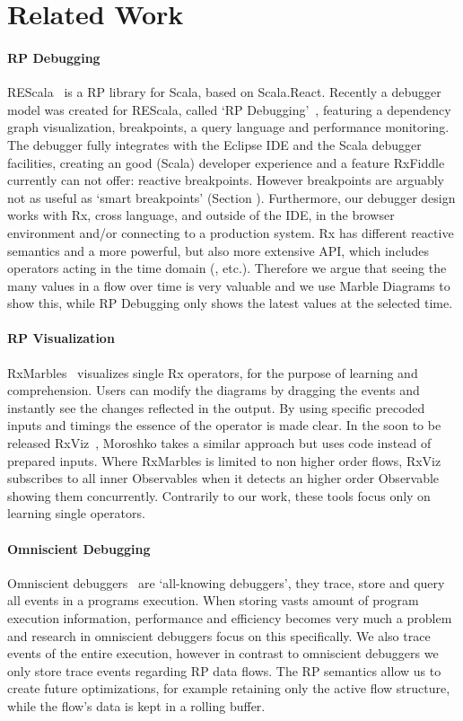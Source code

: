 \section{Related Work}

\paragraph{RP Debugging} 
REScala~\cite{salvaneschi2014rescala} is a RP library for Scala, based on Scala.React. 
Recently a debugger model was created for REScala, called `RP Debugging'~\cite{salvaneschi2016debugging}, 
featuring a dependency graph visualization, breakpoints, a query language and performance monitoring.
The debugger fully integrates with the Eclipse IDE and the Scala debugger facilities, 
creating an good (Scala) developer experience and a feature RxFiddle currently can not offer: reactive breakpoints. 
However breakpoints are arguably not as useful as `smart breakpoints' (Section \label{breakpoints}).
Furthermore, our debugger design works with Rx, cross language, and outside of the IDE,
in the browser environment and/or connecting to a production system.
Rx has different reactive semantics and a more powerful, but also more extensive API, which includes operators acting in the time domain (, etc.).
Therefore we argue that seeing the many values in a flow over time is very valuable and we use Marble Diagrams to show this, 
while RP Debugging only shows the latest values at the selected time.

\paragraph{RP Visualization} 
RxMarbles~\cite{rxmarbles} visualizes single Rx operators, for the purpose of learning and comprehension.
Users can modify the diagrams by dragging the events and instantly see the changes reflected in the output.
By using specific precoded inputs and timings the essence of the operator is made clear.
In the soon to be released RxViz~\cite{rxviz}, 
Moroshko takes a similar approach but uses code instead of prepared inputs.
Where RxMarbles is limited to non higher order flows, RxViz subscribes to all inner Observables when it detects an higher order Observable showing them concurrently.
Contrarily to our work, these tools focus only on learning single operators.

\paragraph{Omniscient Debugging} Omniscient debuggers~\cite{pothier2009back} are `all-knowing debuggers', 
they trace, store and query all events in a programs execution.
When storing vasts amount of program execution information, performance and efficiency becomes very much a problem and research in omniscient debuggers focus on this specifically.
We also trace events of the entire execution, however in contrast to omniscient debuggers we only store trace events regarding RP data flows.
The RP semantics allow us to create future optimizations, for example retaining only the active flow structure, while the flow's data is kept in a rolling buffer.

